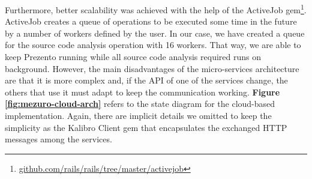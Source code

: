 Furthermore, better scalability was achieved with the help of the ActiveJob
gem\footnote{\url{github.com/rails/rails/tree/master/activejob}}.  ActiveJob
creates a queue of operations to be executed some time in the future by a
number of workers defined by the user. In our case, we have created a queue for
the source code analysis operation with 16 workers. That way, we are able to
keep Prezento running while all source code analysis required runs on
background. However, the main disadvantages of the micro-services architecture
are that it is more complex and, if the API of one of the services change, the
others that use it must adapt to keep the communication working.
\textbf{Figure \ref{fig:mezuro-cloud-arch}} refers to the state diagram for the
cloud-based implementation. Again, there are implicit details we omitted to
keep the simplicity as the Kalibro Client gem that encapsulates the exchanged
HTTP messages among the services.

